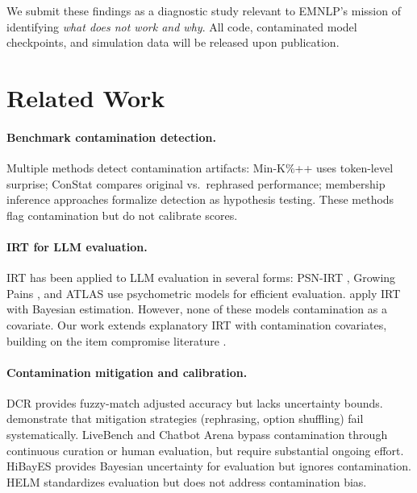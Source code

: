\documentclass[11pt,a4paper]{article}
\begin{document}
We submit these findings as a diagnostic study relevant to EMNLP's mission of identifying \emph{what does not work and why}.
All code, contaminated model checkpoints, and simulation data will be released upon publication.

\section{Related Work}
\label{sec:related}

\paragraph{Benchmark contamination detection.}
Multiple methods detect contamination artifacts: Min-K\%++ \cite{shi2024detecting} uses token-level surprise; ConStat \cite{dekoninck2024constat} compares original vs.\ rephrased performance; membership inference approaches \cite{shokri2017membership,carlini2022membership} formalize detection as hypothesis testing.
These methods flag contamination but do not calibrate scores.

\paragraph{IRT for LLM evaluation.}
IRT has been applied to LLM evaluation in several forms: PSN-IRT \cite{polo2024tinybenchmarks}, Growing Pains \cite{burnell2023rethink}, and ATLAS use psychometric models for efficient evaluation.
\citet{lalor2024benchmarking} apply IRT with Bayesian estimation.
However, none of these models contamination as a covariate.
Our work extends explanatory IRT \cite{deboeck2004explanatory} with contamination covariates, building on the item compromise literature \cite{eckerly2017detecting,sinharay2017assessing}.

\paragraph{Contamination mitigation and calibration.}
DCR \cite{oren2024proving} provides fuzzy-match adjusted accuracy but lacks uncertainty bounds.
\citet{xu2024benchmark} demonstrate that mitigation strategies (rephrasing, option shuffling) fail systematically.
LiveBench \cite{white2024livebench} and Chatbot Arena \cite{zheng2024judging} bypass contamination through continuous curation or human evaluation, but require substantial ongoing effort.
HiBayES provides Bayesian uncertainty for evaluation but ignores contamination.
HELM \cite{liang2023holistic} standardizes evaluation but does not address contamination bias.
\end{document}
